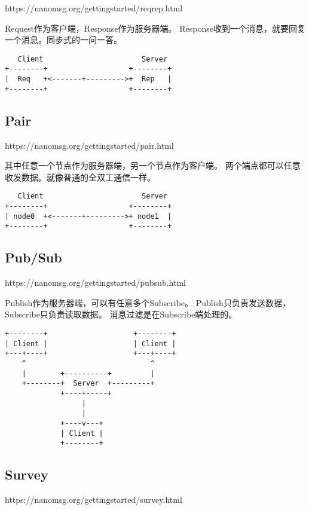 https://nanomsg.org/gettingstarted/reqrep.html

Request作为客户端，Response作为服务器端。
Response收到一个消息，就要回复一个消息。同步式的一问一答。

\begin{verbatim}
   Client                       Server
+--------+                   +--------+
|  Req   +<-------+--------->+  Rep   |
+--------+                   +--------+
\end{verbatim}

\subsection{Pair}

https://nanomsg.org/gettingstarted/pair.html

其中任意一个节点作为服务器端，另一个节点作为客户端。
两个端点都可以任意收发数据。就像普通的全双工通信一样。

\begin{verbatim}
   Client                       Server
+--------+                   +--------+
| node0  +<-------+--------->+ node1  |
+--------+                   +--------+
\end{verbatim}

\subsection{Pub/Sub}

https://nanomsg.org/gettingstarted/pubsub.html

Publish作为服务器端，可以有任意多个Subscribe。
Publish只负责发送数据，Subscribe只负责读取数据。
消息过滤是在Subscribe端处理的。

\begin{verbatim}
+--------+                    +--------+
| Client |                    | Client |
+---+----+                    +---+----+
    ^                             ^
    |        +----------+         |
    +--------+  Server  +---------+
             +----+-----+
                  |
                  |
             +----v---+
             | Client |
             +--------+
\end{verbatim}

\subsection{Survey}

https://nanomsg.org/gettingstarted/survey.html

